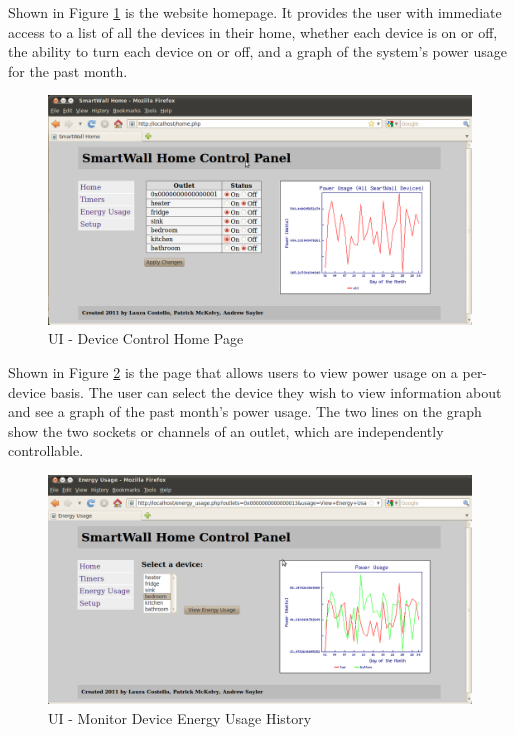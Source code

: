 \documentclass[12pt]{article}
\begin{document}
Shown in Figure \ref{fig:webUI-home} is the website homepage. It provides the
user with immediate access to a list of all the devices in their
home, whether each device is on or off, the ability to turn each
device on or off, and a graph of the system's power usage for the
past month. 

\begin{figure}
  \begin{center}
    \includegraphics[scale=.3]{webUI-home.png}
  \end{center}
  \caption{UI - Device Control Home Page}
  \label{fig:webUI-home}
\end{figure}

Shown in Figure \ref{fig:webUI-energy} is the page that allows users
to view power usage on
a per-device basis. The user can select the device they wish to
view information about and see a graph of the past month’s power
usage. The two lines on the graph show the two sockets or
channels of an outlet, which are independently controllable. 

\begin{figure}
  \begin{center}
    \includegraphics[scale=.3]{webUI-energy.png}
  \end{center}
  \caption{UI - Monitor Device Energy Usage History}
  \label{fig:webUI-energy}
\end{figure}
\end{document}
